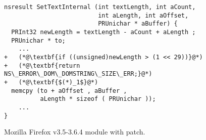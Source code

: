 \begin{figure}
\centering
\begin{lstlisting}
nsresult SetTextInternal (int textLength, int aCount,
                          int aLength, int aOffset,
                          PRUnichar * aBuffer) {
  PRInt32 newLength = textLength - aCount + aLength ;
  PRUnichar * to;
    ...
+   (*@\textbf{if ((unsigned)newLength > (1 << 29))}@*)
+   (*@\textbf{return NS\_ERROR\_DOM\_DOMSTRING\_SIZE\_ERR;}@*)
+   (*@\textbf{$(*)_1$}@*)
  memcpy (to + aOffset , aBuffer ,
          aLength * sizeof ( PRUnichar ));
    ...
}
\end{lstlisting}
%
\caption{Mozilla Firefox  v3.5-3.6.4 module with patch.}
\end{figure} 